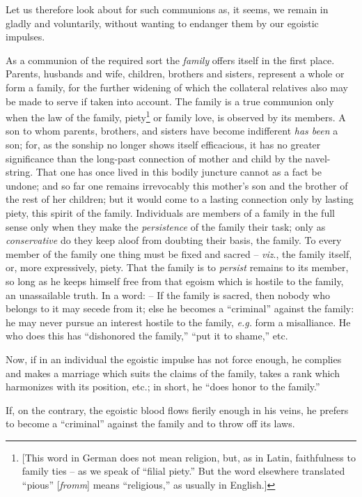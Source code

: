Let us therefore look about for such communions as, it seems, we remain in 
gladly and voluntarily, without wanting to endanger them by our egoistic 
impulses.

As a communion of the required sort the \textit{family} offers itself in the 
first place. Parents, husbands and wife, children, brothers and sisters, 
represent a whole or form a family, for the further widening of which the 
collateral relatives also may be made to serve if taken into account. The 
family is a true communion only when the law of the family, 
piety\footnote{[This word in German does not mean religion, but, as in Latin, 
faithfulness to family ties -- as we speak of ``filial piety.'' But the word 
elsewhere translated ``pious'' [\textit{fromm}] means ``religious,'' as 
usually in English.]} or family love, is observed by its members. A son to 
whom parents, brothers, and sisters have become indifferent \textit{has been} 
a son; for, as the sonship no longer shows itself efficacious, it has no 
greater significance than the long-past connection of mother and child by the 
navel-string. That one has once lived in this bodily juncture cannot as a fact 
be undone; and so far one remains irrevocably this mother's son and the 
brother of the rest of her children; but it would come to a lasting connection 
only by lasting piety, this spirit of the family. Individuals are members of a 
family in the full sense only when they make the \textit{persistence} of the 
family their task; only as \textit{conservative} do they keep aloof from 
doubting their basis, the family. To every member of the family one thing must 
be fixed and sacred -- \textit{viz}., the family itself, or, more 
expressively, piety. That the family is to \textit{persist} remains to its 
member, so long as he keeps himself free from that egoism which is hostile to 
the family, an unassailable truth. In a word: -- If the family is sacred, then 
nobody who belongs to it may secede from it; else he becomes a ``criminal'' 
against the family: he may never pursue an interest hostile to the family, 
\textit{e.g.} form a misalliance. He who does this has ``dishonored the 
family,'' ``put it to shame,'' etc.

Now, if in an individual the egoistic impulse has not force enough, he 
complies and makes a marriage which suits the claims of the family, takes a 
rank which harmonizes with its position, etc.; in short, he ``does honor to 
the family.''

If, on the contrary, the egoistic blood flows fierily enough in his veins, he 
prefers to become a ``criminal'' against the family and to throw off its 
laws.

